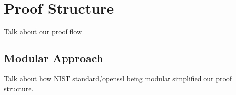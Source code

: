 
\section{Proof Structure}\label{sec:proof}
Talk about our proof flow

\subsection{Modular Approach}
Talk about how NIST standard/openssl being modular simplified our proof structure.